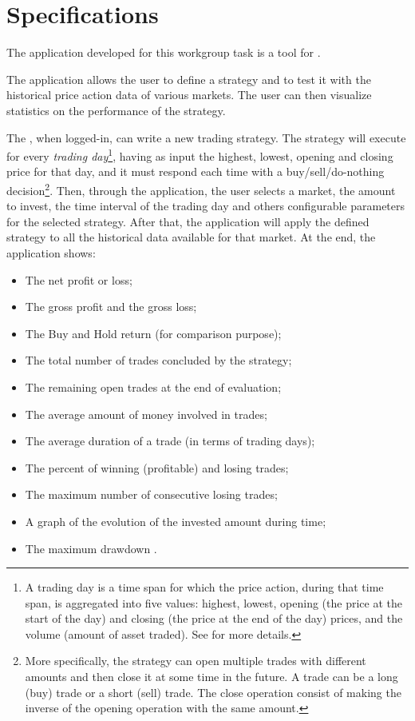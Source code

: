 \chapter{Specifications}\label{ch:specs}

The application developed for this workgroup task is a tool for
.

The application allows the user to define a strategy and to test it with the
historical price action data of various markets. The user can then visualize
statistics on the performance of the strategy.

The , when logged-in, can write a new trading strategy. The
strategy will execute for every \emph{trading day}\footnote{A trading day is a
time span for which the price action, during that time span, is aggregated into
five values: highest, lowest, opening (the price at the start of the day) and
closing (the price at the end of the day) prices, and the volume (amount of
asset traded). See  for more details.}, having as
input the highest, lowest, opening and closing price for that day, and it must
respond each time with a buy/sell/do-nothing decision\footnote{More
specifically, the strategy can open multiple trades with different amounts and
then close it at some time in the future. A trade can be a long (buy) trade or a
short (sell) trade. The close operation consist of making the inverse of the
opening operation with the same amount.}. Then, through the application, the
user selects a market, the amount to invest, the time interval of the trading
day and others configurable parameters for the selected strategy. After that,
the application will apply the defined strategy to all the historical data
available for that market. At the end, the application shows:
\begin{itemize}
	\item The net profit or loss;
	\item The gross profit  and the gross loss;
	\item The Buy and Hold return (for comparison purpose);
	\item The total number of trades concluded by the strategy;
	\item The remaining open trades at the end of evaluation;
	\item The average amount of money involved in trades;
	\item The average duration of a trade (in terms of trading days);
	\item The percent of winning (profitable) and losing trades;
	\item The maximum number of consecutive losing trades;
	\item A graph of the evolution of the invested amount during time;
	\item The maximum drawdown .
\end{itemize}

